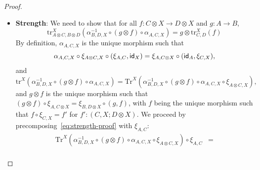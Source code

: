 \begin{example}
\begin{proof}
\begin{itemize}
\[    \]
    On the other hand, by definition, we have that
    \begin{align*}
    \text{tr}^{X}(\text{tr}^{Y}(\alpha_{B,X,Y}^{-1} \circ f \circ \alpha_{A,X,Y})) &= \text{Tr}^{X}(\text{Tr}^{Y}(\alpha_{B,X,Y}^{-1} \circ f \circ \alpha_{A,X,Y} \circ \xi_{A \otimes X, Y}))\\
    &= \text{Tr}^{X}(\text{Tr}^{Y}(\alpha_{B,X,Y}^{-1} \circ f \circ \alpha_{A,X,Y} \circ \xi_{A \otimes X, Y}) \circ \xi_{A,X})
    \end{align*}
    By tightening, we have that
    \[
    \text{Tr}^{Y}(\alpha_{B,X,Y}^{-1} \circ f \circ \alpha_{A,X,Y} \circ \xi_{A \otimes X, Y}) \circ \xi_{A,X} = \text{Tr}^{Y}(\alpha_{B,X,Y}^{-1} \circ f \circ \alpha_{A,X,Y} \circ \xi_{A \otimes X, Y} \circ (\xi_{A,X}, \id_{Y}))
    \]
    By the definition of $\alpha_{A,X,Y}$, we have that
    \[
    \text{Tr}^{Y}(\alpha_{B,X,Y}^{-1} \circ f \circ \alpha_{A,X,Y} \circ \xi_{A \otimes X, Y} \circ (\xi_{A,X}, \id_{Y})) = \text{Tr}^{Y}(\alpha_{B,X,Y}^{-1} \circ f \circ \xi_{A,X \otimes Y} \circ (\id_{A}, \xi_{X,Y})).
    \]
    and therefore,
    \[
    \text{tr}^{X \otimes Y}(f) = \text{tr}^{X}(\text{tr}^{Y}(\alpha_{B,X,Y}^{-1} \circ f \circ \alpha_{A,X,Y}))
    \]
    \item \textbf{Strength}: We need to show that for all $f : C \otimes X \to D \otimes X$ and $g : A \to B$,
    \[
    \text{tr}_{A \otimes C,B \otimes D}^{X}(\alpha^{-1}_{B,D,X} \circ (g \otimes f) \circ \alpha_{A,C,X}) = g \otimes \text{tr}_{C,D}^{X}(f)
    \]
    By definition, $\alpha_{A,C,X}$ is the unique morphism such that
    \[
   \alpha_{A,C,X} \circ \xi_{A \otimes C, X} \circ (\xi_{A,C}, \textsf{id}_{X}) = \xi_{A, C \otimes X} \circ (\textsf{id}_{A}, \xi_{C,X}),
    \]
    and
    \begin{equation}\label{eq:strength-proof}
    \text{tr}^{X}(\alpha^{-1}_{B,D,X} \circ (g \otimes f) \circ \alpha_{A,C,X}) = \text{Tr}^{X}(\alpha^{-1}_{B,D,X} \circ (g \otimes f) \circ \alpha_{A,C,X} \circ \xi_{A \otimes C, X}),
    \end{equation}
    and $g \otimes f$ is the unique morphism such that $(g \otimes f) \circ \xi_{A, C \otimes X} = \xi_{B,D \otimes X} \circ (g, f)$,
    with $f$ being the unique morphism such that $f \circ \xi_{C,X} = f'$ for $f' : (C,X; D \otimes X)$.
    We proceed by precomposing~\autoref{eq:strength-proof} with $\xi_{A,C}$:
    \begin{align*}
     \text{Tr}^{X}(\alpha^{-1}_{B,D,X} \circ (g \otimes f) \circ \alpha_{A,C,X} \circ \xi_{A \otimes C, X}) \circ \xi_{A,C} &=\\

\end{align*}
\end{itemize}
\end{proof}
\end{example}
